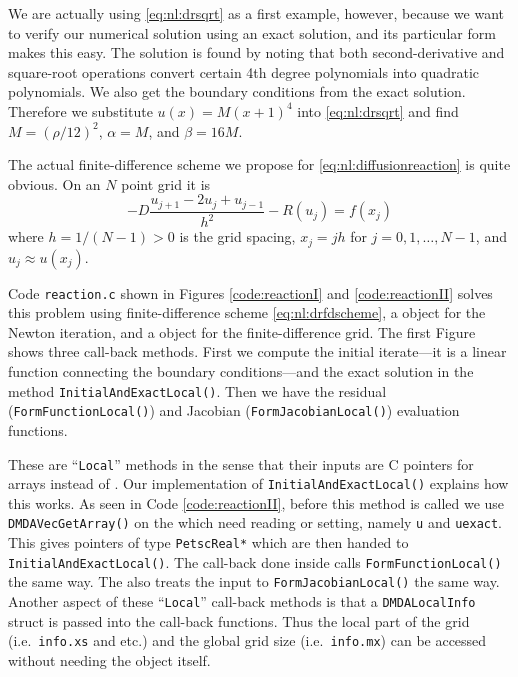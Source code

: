 We are actually using \eqref{eq:nl:drsqrt} as a first example, however, because we want to verify our numerical solution using an exact solution, and its particular form makes this easy.  The solution is found \citep{Ockendonetal2003} by noting that both second-derivative and square-root operations convert certain 4th degree polynomials into quadratic polynomials.  We also get the boundary conditions from the exact solution.  Therefore we substitute $u(x)=M(x+1)^4$ into \eqref{eq:nl:drsqrt} and find $M=(\rho/12)^2$, $\alpha=M$, and $\beta=16 M$.

The actual finite-difference scheme we propose for \eqref{eq:nl:diffusionreaction} is quite obvious.  On an $N$ point grid it is
\begin{equation}
- D \frac{u_{j+1} - 2 u_j + u_{j-1}}{h^2} - R(u_j) = f(x_j)   \label{eq:nl:drfdscheme}
\end{equation}
where $h=1/(N-1)>0$ is the grid spacing, $x_j = j h$ for $j=0,1,\dots,N-1$, and $u_j \approx u(x_j)$.

Code \texttt{reaction.c} shown in Figures \ref{code:reactionI} and \ref{code:reactionII} solves this problem using finite-difference scheme \eqref{eq:nl:drfdscheme}, a \pSNES object for the Newton iteration, and a \pDMDA object for the finite-difference grid.  The first Figure shows three call-back methods.  First we compute the initial iterate---it is a linear function connecting the boundary conditions---and the exact solution in the method \texttt{InitialAndExactLocal()}.  Then we have the residual (\texttt{FormFunctionLocal()}) and Jacobian (\texttt{FormJacobianLocal()}) evaluation functions.



These are ``\texttt{Local}'' methods in the sense that their inputs are C pointers for arrays instead of \pVecs.  Our implementation of \texttt{InitialAndExactLocal()} explains how this works.  As seen in Code \ref{code:reactionII}, before this method is called we use \texttt{DMDAVecGetArray()} on the \pVecs which need reading or setting, namely \texttt{u} and \texttt{uexact}.  This gives pointers of type \texttt{PetscReal*} which are then handed to \texttt{InitialAndExactLocal()}.  The call-back done inside \pSNES calls \texttt{FormFunctionLocal()} the same way.  The \pSNES also treats the input to  \texttt{FormJacobianLocal()} the same way.  Another aspect of these ``\texttt{Local}'' call-back methods is that a \texttt{DMDALocalInfo} struct is passed into the call-back functions.  Thus the local part of the grid (i.e.~\texttt{info.xs} and etc.) and the global grid size (i.e.~\texttt{info.mx}) can be accessed without needing the \pDMDA object itself.

